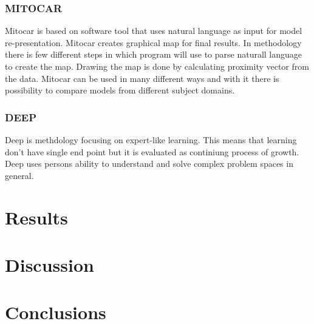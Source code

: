 \documentclass[english]{tktltiki2}
\theoremstyle{definition}
\theoremstyle{remark}
\begin{document}
\subsubsection{MITOCAR}

Mitocar is based on software tool that uses natural language as input for model re-presentation. Mitocar creates graphical map for final results. In methodology there is few different steps in which program will use to parse naturall language to create the map. Drawing the map is done by calculating proximity vector from the data. Mitocar can be used in many different ways and with it there is possibility to compare models from different subject domains.

\subsubsection{DEEP}

Deep is methdology focusing on expert-like learning. This means that learning don't have single end point but it is evaluated as continiung process of growth. Deep uses persons ability to understand and solve complex problem spaces in general.

\section{Results}

\section{Discussion}

\section{Conclusions}

%
%
% 
%







%
\end{document}
